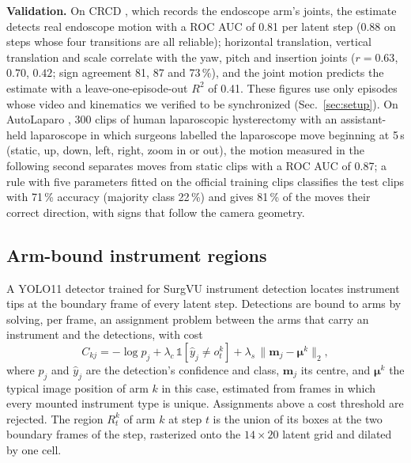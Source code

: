 \textbf{Validation.} On CRCD \cite{crcd}, which records the endoscope arm's joints, the estimate detects real endoscope motion with a ROC AUC of 0.81 per latent step (0.88 on steps whose four transitions are all reliable); horizontal translation, vertical translation and scale correlate with the yaw, pitch and insertion joints ($r=0.63$, $0.70$, $0.42$; sign agreement 81, 87 and 73\,\%), and the joint motion predicts the estimate with a leave-one-episode-out $R^2$ of 0.41. These figures use only episodes whose video and kinematics we verified to be synchronized (Sec.~\ref{sec:setup}). On AutoLaparo \cite{autolaparo}, 300 clips of human laparoscopic hysterectomy with an assistant-held laparoscope in which surgeons labelled the laparoscope move beginning at 5\,s (static, up, down, left, right, zoom in or out), the motion measured in the following second separates moves from static clips with a ROC AUC of 0.87; a rule with five parameters fitted on the official training clips classifies the test clips with 71\,\% accuracy (majority class 22\,\%) and gives 81\,\% of the moves their correct direction, with signs that follow the camera geometry.

\subsection{Arm-bound instrument regions}
A YOLO11 detector \cite{yolo11} trained for SurgVU instrument detection locates instrument tips at the boundary frame of every latent step. Detections are bound to arms by solving, per frame, an assignment problem \cite{hungarian} between the arms that carry an instrument and the detections, with cost
\begin{equation}
C_{kj}=-\log p_j+\lambda_c\,\mathbb{1}[\hat y_j\neq o^k_t]+\lambda_s\,\lVert \mathbf{m}_j-\boldsymbol{\mu}^k\rVert_2,
\end{equation}
where $p_j$ and $\hat y_j$ are the detection's confidence and class, $\mathbf{m}_j$ its centre, and $\boldsymbol{\mu}^k$ the typical image position of arm $k$ in this case, estimated from frames in which every mounted instrument type is unique. Assignments above a cost threshold are rejected. The region $R^k_t$ of arm $k$ at step $t$ is the union of its boxes at the two boundary frames of the step, rasterized onto the $14\times20$ latent grid and dilated by one cell.

